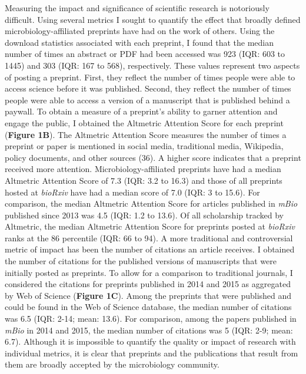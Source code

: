 \documentclass[11pt,]{article}
\begin{document}
Measuring the impact and significance of scientific research is
notoriously difficult. Using several metrics I sought to quantify the
effect that broadly defined microbiology-affiliated preprints have had
on the work of others. Using the download statistics associated with
each preprint, I found that the median number of times an abstract or
PDF had been accessed was 923 (IQR: 603 to 1445) and 303 (IQR: 167 to
568), respectively. These values represent two aspects of posting a
preprint. First, they reflect the number of times people were able to
access science before it was published. Second, they reflect the number
of times people were able to access a version of a manuscript that is
published behind a paywall. To obtain a measure of a preprint's ability
to garner attention and engage the public, I obtained the Altmetric
Attention Score for each preprint (\textbf{Figure 1B}). The Altmetric
Attention Score measures the number of times a preprint or paper is
mentioned in social media, traditional media, Wikipedia, policy
documents, and other sources (36). A higher score indicates that a
preprint received more attention. Microbiology-affiliated preprints have
had a median Altmetric Attention Score of 7.3 (IQR: 3.2 to 16.3) and
those of all preprints hosted at \emph{bioRxiv} have had a median score
of 7.0 (IQR: 3 to 15.6). For comparison, the median Altmetric Attention
Score for articles published in \emph{mBio} published since 2013 was 4.5
(IQR: 1.2 to 13.6). Of all scholarship tracked by Altmetric, the median
Altmetric Attention Score for preprints posted at \emph{bioRxiv} ranks
at the 86 percentile (IQR: 66 to 94). A more traditional and
controversial metric of impact has been the number of citations an
article receives. I obtained the number of citations for the published
versions of manuscripts that were initially posted as preprints. To
allow for a comparison to traditional journals, I considered the
citations for preprints published in 2014 and 2015 as aggregated by Web
of Science (\textbf{Figure 1C}). Among the preprints that were published
and could be found in the Web of Science database, the median number of
citations was 6.5 (IQR: 2-14; mean: 13.6). For comparison, among the
papers published in \emph{mBio} in 2014 and 2015, the median number of
citations was 5 (IQR: 2-9; mean: 6.7). Although it is impossible to
quantify the quality or impact of research with individual metrics, it
is clear that preprints and the publications that result from them are
broadly accepted by the microbiology community.
\end{document}
